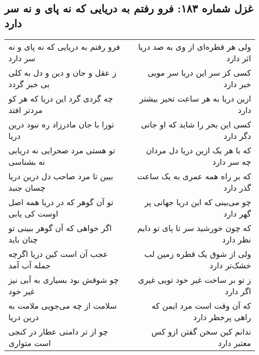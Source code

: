 \begin{center}
\section*{غزل شماره ۱۸۳: فرو رفتم به دریایی که نه پای و نه سر دارد}
\label{sec:183}
\begin{longtable}{l p{0.5cm} r}
فرو رفتم به دریایی که نه پای و نه سر دارد
&&
ولی هر قطره‌ای از وی به صد دریا اثر دارد
\\
ز عقل و جان و دین و دل به کلی بی خبر گردد
&&
کسی کز سر این دریا سر مویی خبر دارد
\\
چه گردی گرد این دریا که هر کو مردتر افتد
&&
ازین دریا به هر ساعت تحیر بیشتر دارد
\\
تورا با جان مادرزاد ره نبود درین دریا
&&
کسی این بحر را شاید که او جانی دگر دارد
\\
تو هستی مرد صحرایی نه دریابی نه بشناسی
&&
که با هر یک ازین دریا دل مردان چه سر دارد
\\
ببین تا مرد صاحب دل درین دریا چسان جنبد
&&
که بر راه همه عمری به یک ساعت گذر دارد
\\
تو آن گوهر که در دریا همه اصل اوست کی یابی
&&
چو می‌بینی که این دریا جهانی پر گهر دارد
\\
اگر خواهی که آن گوهر ببینی تو چنان باید
&&
که چون خورشید سر تا پای تو دایم نظر دارد
\\
عجب آن است کین دریا اگرچه جمله آب آمد
&&
ولی از شوق یک قطره زمین لب خشک‌تر دارد
\\
چو شوقش بود بسیاری به آبی نیز غیر خود
&&
ز تو بر ساخت غیر خود تویی غیری اگر دارد
\\
سلامت از چه می‌جویی ملامت به درین دریا
&&
که آن وقت است مرد ایمن که راهی پرخطر دارد
\\
چو از تر دامنی عطار در کنجی است متواری
&&
ندانم کین سخن گفتن ازو کس معتبر دارد
\\
\end{longtable}
\end{center}
